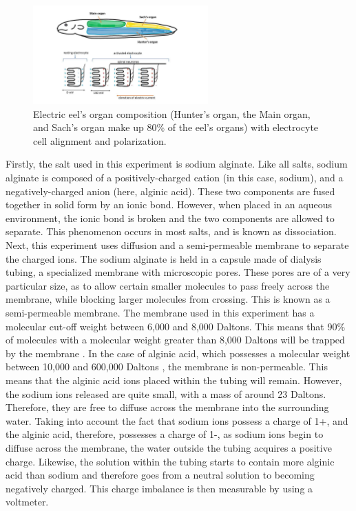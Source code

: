 \documentclass[letterpaper]{article}
\begin{document}
\begin{figure}[H]
	\centering
	\includegraphics[width=0.60\textwidth]{fig1.jpg}
	\caption{Electric eel's organ composition (Hunter's organ, the Main organ, and Sach's organ make up 80\% of the eel's organs) with electrocyte cell alignment and polarization.}
	\label{fig:1}
\end{figure}

Firstly, the salt used in this experiment is sodium 
alginate. Like all salts, sodium alginate is composed of a positively-charged cation (in this case, sodium),
and a negatively-charged anion (here, alginic acid). These two components are fused together in solid 
form by an ionic bond. However, when placed in an aqueous environment, the ionic bond is broken and 
the two components are allowed to separate. This phenomenon occurs in most salts, and is known as 
dissociation. Next, this experiment uses diffusion and a semi-permeable membrane to separate the charged 
ions. The sodium alginate is held in a capsule made of dialysis tubing, a specialized membrane with 
microscopic pores. These pores are of a very particular size, as to allow certain smaller molecules to 
pass freely across the membrane, while blocking larger molecules from crossing. This is known as a 
semi-permeable membrane. The membrane used in this experiment has a molecular cut-off weight between 
6,000 and 8,000 Daltons. This means that 90\% of molecules with a molecular weight greater than 8,000 
Daltons will be trapped by the membrane \parencite{MolecularWeightCut2014}. In the case of alginic acid, 
which possesses a molecular weight between 10,000 and 600,000 Daltons 
\parencite{MolecularWeightDetermination}, the membrane is non-permeable. This means that the alginic 
acid ions placed within the tubing will remain. However, the sodium ions released are quite small, with 
a mass of around 23 Daltons. Therefore, they are free to diffuse across the membrane into the surrounding 
water. Taking into account the fact that sodium ions possess a charge of 1+, and the alginic acid, 
therefore, possesses a charge of 1-, as sodium ions begin to diffuse across the membrane, the water 
outside the tubing acquires a positive charge. Likewise, the solution within the tubing starts to 
contain more alginic acid than sodium and therefore goes from a neutral solution to becoming 
negatively charged. This charge imbalance is then measurable by using a voltmeter.
\end{document}
